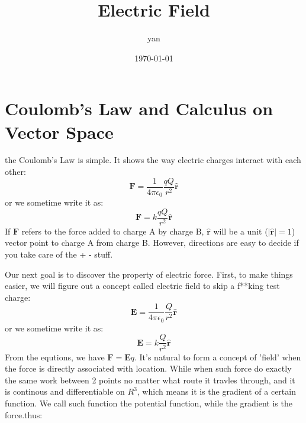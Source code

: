 \documentclass{article}
\title{Electric Field}
\author{yan}
\date{\today}
\begin{document}
\part{Coulomb's Law and Calculus on Vector Space}
the Coulomb's Law is simple. It shows the way electric charges interact with each other:
\begin{equation}
\mathbf{F}=\frac{1}{4\pi\epsilon_0}\frac{qQ}{r^2}\mathbf{\hat{r}}
\end{equation}
or we sometime write it as:
\begin{equation}
\mathbf{F}=k\frac{qQ}{r^2}\mathbf{\hat{r}}
\end{equation}
If $\mathbf{F}$ refers to the force added to charge A by charge B, $\mathbf{\hat{r}}$ will be a unit ($|\mathbf{\hat{r}}| = 1$) vector point to charge A from charge B. However, directions are easy to decide if you take care of the + - stuff.


Our next goal is to discover the property of electric force. First, to make things easier, we will figure out a concept called electric field to skip a f**king test charge:
\begin{equation}
\mathbf{E}=\frac{1}{4\pi\epsilon_0}\frac{Q}{r^2}\mathbf{\hat{r}}
\end{equation}
or we sometime write it as:
\begin{equation}
\mathbf{E}=k\frac{Q}{r^2}\mathbf{\hat{r}}
\end{equation}
From the equtions, we have $\mathbf{F} = \mathbf{E}q$. It's natural to form a concept of 'field' when the force is directly associated with location. While when such force do exactly the same work between 2 points no matter what route it travles through, and it is continous and differentiable on $R^3$, which means it is the gradient of a certain function. We call such function the potential function, while the gradient is the force.thus:
\phi
\end{document}
